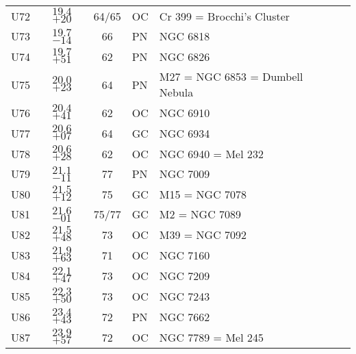 \begin{table}[p]
\begin{tabular}{lcclll}
U72 &$19.4$ $+20$&64/65&OC &Cr 399 = Brocchi's Cluster\\
U73 &$19.7$ $-14$&66&PN &NGC 6818\\
U74 &$19.7$ $+51$&62&PN &NGC 6826\\
U75 &$20.0$ $+23$&64&PN &M27 = NGC 6853 = Dumbell Nebula\\
U76 &$20.4$ $+41$&62&OC &NGC 6910\\
U77 &$20.6$ $+07$&64&GC &NGC 6934\\
U78 &$20.6$ $+28$&62&OC &NGC 6940 = Mel 232\\
U79 &$21.1$ $-11$&77&PN &NGC 7009\\
U80 &$21.5$ $+12$&75&GC &M15 = NGC 7078\\
U81 &$21.6$ $-01$&75/77&GC &M2 = NGC 7089\\
U82 &$21.5$ $+48$&73&OC &M39 = NGC 7092\\
U83 &$21.9$ $+63$&71&OC &NGC 7160\\
U84 &$22.1$ $+47$&73&OC &NGC 7209\\
U85 &$22.3$ $+50$&73&OC &NGC 7243\\
U86 &$23.4$ $+43$&72&PN &NGC 7662\\
U87 &$23.9$ $+57$&72&OC &NGC 7789 = Mel 245\\
\hline
\end{tabular}
\end{table}

\clearpage

\twocolumn


\onecolumn

